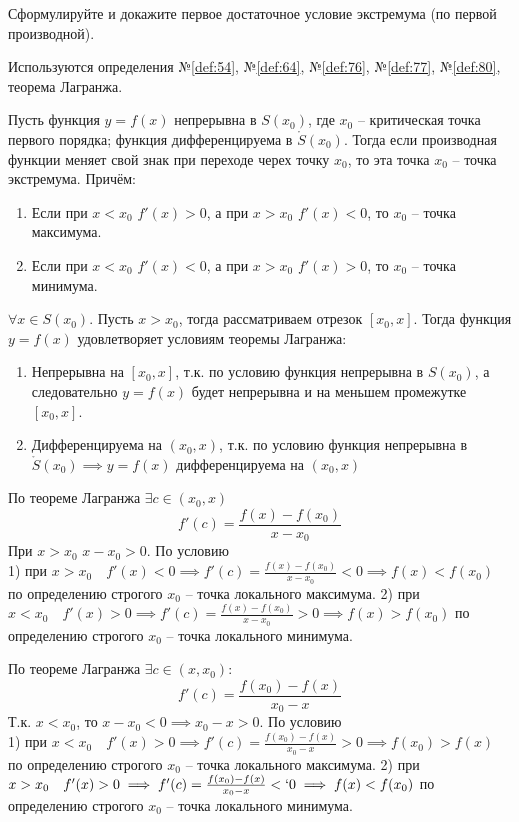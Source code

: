 \begin{question}
    Сформулируйте и докажите первое достаточное условие экстремума (по первой производной).
\end{question}
\begin{used}
    Используются определения №\ref{def:54}, №\ref{def:64}, №\ref{def:76}, №\ref{def:77}, №\ref{def:80}, теорема Лагранжа.
\end{used}
\begin{theorem}
    Пусть функция $y=f(x)$ непрерывна в $S(x_0)$, где $x_0$ -- критическая точка первого порядка; функция дифференцируема в $\mathring{S}(x_0)$. Тогда если производная функции меняет свой знак при переходе черех точку $x_0$, то эта точка $x_0$ -- точка экстремума. Причём:
    \begin{enumerate}
        \item Если при $x < x_0$ $f'(x) > 0$, а при  $x > x_0$ $f'(x) < 0$, то  $x_0$ -- точка максимума.
        \item Если при $x < x_0$ $f'(x) < 0$, а при  $x > x_0$ $f'(x) > 0$, то  $x_0$ -- точка минимума.
    \end{enumerate}
\end{theorem}
\begin{sufficiency}
    $\forall x \in S(x_0)$. Пусть $x > x_0$, тогда рассматриваем отрезок $[x_0, x]$. Тогда функция $y = f(x)$ удовлетворяет условиям теоремы Лагранжа:
    \begin{enumerate}
        \item Непрерывна на $[x_0, x]$, т.к. по условию функция непрерывна в $S(x_0)$, а следовательно $y=f(x)$ будет непрерывна и на меньшем промежутке $[x_0, x]$.
        \item Дифференцируема на $(x_0, x)$, т.к. по условию функция непрерывна в $\mathring{S}(x_0) \implies y = f(x)$ дифференцируема на $(x_0, x)$
    \end{enumerate}

    По теореме Лагранжа $\exists  c \in  (x_0, x)$ \[
        f'(c) = \frac{f(x) - f(x_0)}{x - x_0}
    \]
    При $x > x_0$ $x - x_0 > 0$. 
    По условию \\
    1) при $x > x_0 \quad f'(x) < 0 \implies f'(c) = \frac{f(x) - f(x_0)}{x - x_0} < 0 \implies f(x) < f(x_0)$ по определению строгого  $x_0$ -- точка локального максимума.
    2) при $x < x_0 \quad f'(x) > 0 \implies f'(c) = \frac{f(x) - f(x_0)}{x - x_0} > 0 \implies f(x) > f(x_0)$ по определению строгого  $x_0$ -- точка локального минимума.

    По теореме Лагранжа $\exists c \in (x, x_0)$: \[
        f'(c) = \frac{f(x_0) - f(x)}{x_0 - x}
    \] 
    Т.к. $x < x_0$, то $x - x_0 < 0 \implies x_0 - x > 0$.
    По условию \\
    1) при $x < x_0 \quad f'(x) > 0 \implies f'(c) = \frac{f(x_0) - f(x)}{x_0 - x} > 0 \implies f(x_0) > f(x)$ по определению строгого  $x_0$ -- точка локального максимума.
    2) при $x > x_0 \quad f'(x) > 0 \implies f'(c) = \frac{f(x_0) - f(x)}{x_0 - x} <` 0 \implies f(x) < f(x_0)$ по определению строгого  $x_0$ -- точка локального минимума.
\end{sufficiency}
\pagebreak



